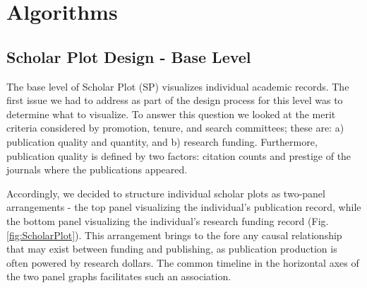 \chapter{Algorithms}\label{chap:Algorithms}
\section{Scholar Plot Design - Base Level}
The base level of Scholar Plot (SP) visualizes individual academic records. The first issue we had to address as part of the design process for this level was to determine what to visualize. To answer this question we looked at the merit criteria considered by promotion, tenure, and search committees; these are: a) publication quality and quantity, and b) research funding. Furthermore, publication quality is defined by two factors: citation counts and prestige of the journals where the publications appeared. 

Accordingly, we decided to structure individual scholar plots as two-panel arrangements - the top panel visualizing the individual's publication record, while the bottom panel visualizing the individual's research funding record (Fig. \ref{fig:ScholarPlot}). This arrangement brings to the fore any causal relationship that may exist between funding and publishing, as publication production is often powered by research dollars. The common timeline in the horizontal axes of the two panel graphs facilitates such an association. 

